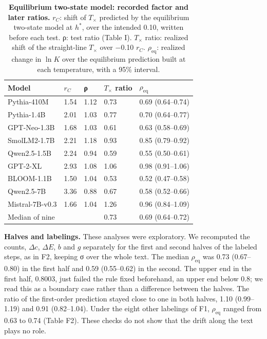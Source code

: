 \documentclass[aps,prx,onecolumn,superscriptaddress,longbibliography]{revtex4-2}
\begin{document}
\begin{table}[htbp]
\centering
\small
\setlength{\tabcolsep}{6pt}
\renewcommand{\thetable}{F9}
\caption{\textbf{Equilibrium two-state model: recorded factor and later ratios.} \(r_{C}\): shift of \(T_{\times}\) predicted by the equilibrium two-state model at \(h^*\), over the intended 0.10, written before each test. ρ: test ratio (Table I). \(T_{\times}\) ratio: realized shift of the straight-line \(T_{\times}\) over −0.10 \(r_{C}\). \(\rho_{\mathrm{eq}}\): realized change in \(\ln K\) over the equilibrium prediction built at each temperature, with a 95\% interval.}
\label{tabF9}
\begin{tabular}{@{}lllll@{}}
\toprule
Model & \(r_{C}\) & ρ & \(T_{\times}\) ratio & \(\rho_{\mathrm{eq}}\) \\
\midrule
Pythia-410M & 1.54 & 1.12 & 0.73 & 0.69 (0.64--0.74) \\
Pythia-1.4B & 2.01 & 1.03 & 0.77 & 0.70 (0.64--0.77) \\
GPT-Neo-1.3B & 1.68 & 1.03 & 0.61 & 0.63 (0.58--0.69) \\
SmolLM2-1.7B & 2.21 & 1.18 & 0.93 & 0.85 (0.79--0.92) \\
Qwen2.5-1.5B & 2.24 & 0.94 & 0.59 & 0.55 (0.50--0.61) \\
GPT-2-XL & 2.93 & 1.08 & 1.06 & 0.98 (0.91--1.06) \\
BLOOM-1.1B & 1.50 & 1.04 & 0.53 & 0.52 (0.47--0.58) \\
Qwen2.5-7B & 3.36 & 0.88 & 0.67 & 0.58 (0.52--0.66) \\
Mistral-7B-v0.3 & 1.66 & 1.04 & 1.26 & 0.96 (0.84--1.09) \\
Median of nine & & & 0.73 & 0.69 (0.64--0.72) \\
\bottomrule
\end{tabular}
\end{table}


\textbf{Halves and labelings.} These analyses were exploratory. We recomputed the counts, \(\Delta c\), \(\Delta E\), \(b\) and \(g\) separately for the first and second halves of the labeled steps, as in F2, keeping σ over the whole text. The median \(\rho_{\mathrm{eq}}\) was 0.73 (0.67--0.80) in the first half and 0.59 (0.55--0.62) in the second. The upper end in the first half, 0.8003, just failed the rule fixed beforehand, an upper end below 0.8; we read this as a boundary case rather than a difference between the halves. The ratio of the first-order prediction stayed close to one in both halves, 1.10 (0.99--1.19) and 0.91 (0.82--1.04). Under the eight other labelings of F1, \(\rho_{\mathrm{eq}}\) ranged from 0.63 to 0.74 (Table F2). These checks do not show that the drift along the text plays no role.
\end{document}
